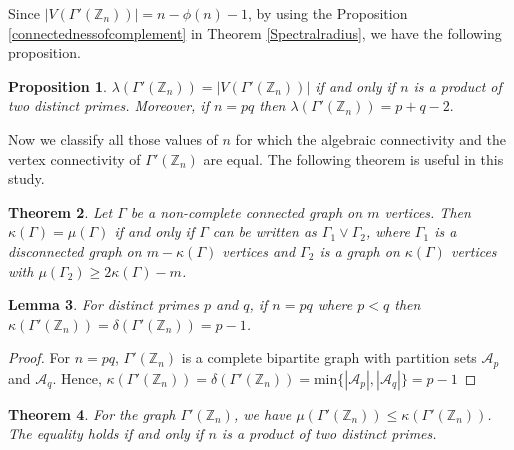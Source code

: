 \documentclass{amsart}
\theoremstyle{plain}
\newtheorem{theorem}{Theorem}[section]
\newtheorem{lemma}[theorem]{Lemma}
\newtheorem{proposition}[theorem]{Proposition}
\theoremstyle{definition}
\theoremstyle{remark}
\begin{document}
Since $| V(\Gamma'(\mathbb{Z}_n))| = n - \phi(n) - 1$,  by using the Proposition \ref{connectednessofcomplement} in Theorem \ref{Spectralradius}, we have the following proposition.

\begin{proposition}
$\lambda(\Gamma'(\mathbb{Z}_n)) = | V(\Gamma'(\mathbb{Z}_n))|$ if and only if $n$ is a product of two distinct primes. Moreover, if $n = pq$ then $\lambda(\Gamma'(\mathbb{Z}_n)) = p + q - 2.$
\end{proposition}

Now we classify all those values of $n$ for which the algebraic connectivity and the vertex connectivity of $\Gamma'(\mathbb{Z}_n)$ are equal. The following theorem is useful in this study.

\begin{theorem}\cite{kirkland2002graphs}\label{equality of vertex and algebraic connectivity}
Let $\Gamma$ be a non-complete connected graph on $m$ vertices. Then $\kappa(\Gamma) = \mu(\Gamma)$ if and only if $\Gamma$ can be written as $\Gamma_1 \vee \Gamma_2$, where $\Gamma_1$ is a disconnected graph on $m- \kappa(\Gamma)$ vertices and $\Gamma_2$ is a graph on $\kappa(\Gamma)$ vertices with $\mu(\Gamma_2) \ge 2\kappa(\Gamma)-m$.
\end{theorem}

\begin{lemma} \label{vertexconnectivityofn = pq}
For distinct primes $p$ and $q$, if $n=pq$ where $p<q$ then $\kappa(\Gamma'(\mathbb{Z}_n)) = \delta(\Gamma'(\mathbb{Z}_n)) = p-1 $.
\end{lemma}

\begin{proof}
For $n = pq$, $\Gamma'(\mathbb{Z}_n)$ is a complete bipartite graph with partition sets $\mathcal{A}_p$ and $\mathcal{A}_q$. Hence, $\kappa(\Gamma'(\mathbb{Z}_n)) = \delta(\Gamma'(\mathbb{Z}_n)) = \text{min}\{ |\mathcal{A}_p|, |\mathcal{A}_q| \} = p-1$
\end{proof}


\begin{theorem}
For the graph $\Gamma'(\mathbb{Z}_n)$, we have $\mu(\Gamma'(\mathbb{Z}_n)) \le \kappa(\Gamma'(\mathbb{Z}_n))$. The equality holds if and only if $n$ is a product of two distinct primes.
\end{theorem}
\end{document}

